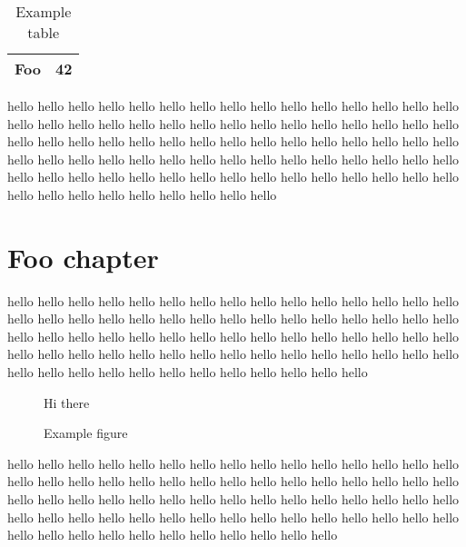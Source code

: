 \documentclass[11pt,letter,oneside]{book}
\begin{document}
\begin{table}
\begin{center}
\begin{tabular}{|l|l|}
\hline
Foo & 42 \\
\hline
\end{tabular}
\end{center}
\caption{Example table}
\label{eg-table}
\end{table}

hello hello hello hello hello hello hello hello hello hello hello hello hello hello hello hello hello hello hello hello hello hello hello hello hello hello hello hello hello hello hello hello hello hello hello hello hello hello hello hello hello hello hello hello hello hello hello hello hello hello hello hello hello hello hello hello hello hello hello hello hello hello hello hello hello hello hello hello hello hello hello hello hello hello hello hello hello hello hello hello hello hello hello hello


\chapter{Foo chapter}
hello hello hello hello hello hello hello hello hello hello hello hello hello hello hello hello hello hello hello hello hello hello hello hello hello hello hello hello hello hello hello hello hello hello hello hello hello hello hello hello hello hello hello hello hello hello hello hello hello hello hello hello hello hello hello hello hello hello hello hello hello hello hello hello hello hello hello hello hello hello hello hello

\begin{figure}
\begin{center}
Hi there
\end{center}
\caption{Example figure}
\label{eg-figure}
\end{figure}

hello hello hello hello hello hello hello hello hello hello hello hello hello hello hello hello hello hello hello hello hello hello hello hello hello hello hello hello hello hello hello hello hello hello hello hello hello hello hello hello hello hello hello hello hello hello hello hello hello hello hello hello hello hello hello hello hello hello hello hello hello hello hello hello hello hello hello hello hello hello hello \citep{newton-etal2015}
\end{document}
